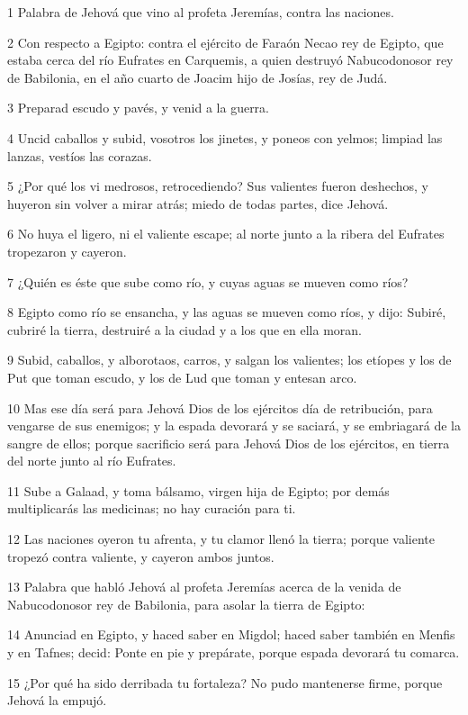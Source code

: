 \par 1 Palabra de Jehová que vino al profeta Jeremías, contra las naciones.
\par 2 Con respecto a Egipto: contra el ejército de Faraón Necao rey de Egipto, que estaba cerca del río Eufrates en Carquemis, a quien destruyó Nabucodonosor rey de Babilonia, en el año cuarto de Joacim hijo de Josías, rey de Judá.
\par 3 Preparad escudo y pavés, y venid a la guerra.
\par 4 Uncid caballos y subid, vosotros los jinetes, y poneos con yelmos; limpiad las lanzas, vestíos las corazas.
\par 5 ¿Por qué los vi medrosos, retrocediendo? Sus valientes fueron deshechos, y huyeron sin volver a mirar atrás; miedo de todas partes, dice Jehová.
\par 6 No huya el ligero, ni el valiente escape; al norte junto a la ribera del Eufrates tropezaron y cayeron.
\par 7 ¿Quién es éste que sube como río, y cuyas aguas se mueven como ríos?
\par 8 Egipto como río se ensancha, y las aguas se mueven como ríos, y dijo: Subiré, cubriré la tierra, destruiré a la ciudad y a los que en ella moran.
\par 9 Subid, caballos, y alborotaos, carros, y salgan los valientes; los etíopes y los de Put que toman escudo, y los de Lud que toman y entesan arco.
\par 10 Mas ese día será para Jehová Dios de los ejércitos día de retribución, para vengarse de sus enemigos; y la espada devorará y se saciará, y se embriagará de la sangre de ellos; porque sacrificio será para Jehová Dios de los ejércitos, en tierra del norte junto al río Eufrates.
\par 11 Sube a Galaad, y toma bálsamo, virgen hija de Egipto; por demás multiplicarás las medicinas; no hay curación para ti.
\par 12 Las naciones oyeron tu afrenta, y tu clamor llenó la tierra; porque valiente tropezó contra valiente, y cayeron ambos juntos.
\par 13 Palabra que habló Jehová al profeta Jeremías acerca de la venida de Nabucodonosor rey de Babilonia, para asolar la tierra de Egipto: 
\par 14 Anunciad en Egipto, y haced saber en Migdol; haced saber también en Menfis y en Tafnes; decid: Ponte en pie y prepárate, porque espada devorará tu comarca.
\par 15 ¿Por qué ha sido derribada tu fortaleza? No pudo mantenerse firme, porque Jehová la empujó.
